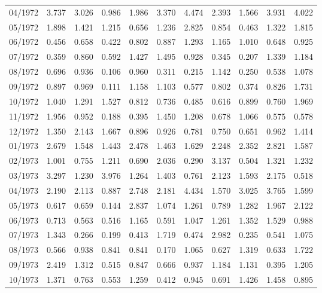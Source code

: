 \begin{tabular}{lrrrrrrrrrr}
04/1972 &  3.737 &  3.026 &  0.986 &  1.986 &  3.370 &  4.474 &  2.393 &  1.566 &  3.931 &  4.022 \\
05/1972 &  1.898 &  1.421 &  1.215 &  0.656 &  1.236 &  2.825 &  0.854 &  0.463 &  1.322 &  1.815 \\
06/1972 &  0.456 &  0.658 &  0.422 &  0.802 &  0.887 &  1.293 &  1.165 &  1.010 &  0.648 &  0.925 \\
07/1972 &  0.359 &  0.860 &  0.592 &  1.427 &  1.495 &  0.928 &  0.345 &  0.207 &  1.339 &  1.184 \\
08/1972 &  0.696 &  0.936 &  0.106 &  0.960 &  0.311 &  0.215 &  1.142 &  0.250 &  0.538 &  1.078 \\
09/1972 &  0.897 &  0.969 &  0.111 &  1.158 &  1.103 &  0.577 &  0.802 &  0.374 &  0.826 &  1.731 \\
10/1972 &  1.040 &  1.291 &  1.527 &  0.812 &  0.736 &  0.485 &  0.616 &  0.899 &  0.760 &  1.969 \\
11/1972 &  1.956 &  0.952 &  0.188 &  0.395 &  1.450 &  1.208 &  0.678 &  1.066 &  0.575 &  0.578 \\
12/1972 &  1.350 &  2.143 &  1.667 &  0.896 &  0.926 &  0.781 &  0.750 &  0.651 &  0.962 &  1.414 \\
01/1973 &  2.679 &  1.548 &  1.443 &  2.478 &  1.463 &  1.629 &  2.248 &  2.352 &  2.821 &  1.587 \\
02/1973 &  1.001 &  0.755 &  1.211 &  0.690 &  2.036 &  0.290 &  3.137 &  0.504 &  1.321 &  1.232 \\
03/1973 &  3.297 &  1.230 &  3.976 &  1.264 &  1.403 &  0.761 &  2.123 &  1.593 &  2.175 &  0.518 \\
04/1973 &  2.190 &  2.113 &  0.887 &  2.748 &  2.181 &  4.434 &  1.570 &  3.025 &  3.765 &  1.599 \\
05/1973 &  0.617 &  0.659 &  0.144 &  2.837 &  1.074 &  1.261 &  0.789 &  1.282 &  1.967 &  2.122 \\
06/1973 &  0.713 &  0.563 &  0.516 &  1.165 &  0.591 &  1.047 &  1.261 &  1.352 &  1.529 &  0.988 \\
07/1973 &  1.343 &  0.266 &  0.199 &  0.413 &  1.719 &  0.474 &  2.982 &  0.235 &  0.541 &  1.075 \\
08/1973 &  0.566 &  0.938 &  0.841 &  0.841 &  0.170 &  1.065 &  0.627 &  1.319 &  0.633 &  1.722 \\
09/1973 &  2.419 &  1.312 &  0.515 &  0.847 &  0.666 &  0.937 &  1.184 &  1.131 &  0.395 &  1.205 \\
10/1973 &  1.371 &  0.763 &  0.553 &  1.259 &  0.412 &  0.945 &  0.691 &  1.426 &  1.458 &  0.895 \\

\end{tabular}
